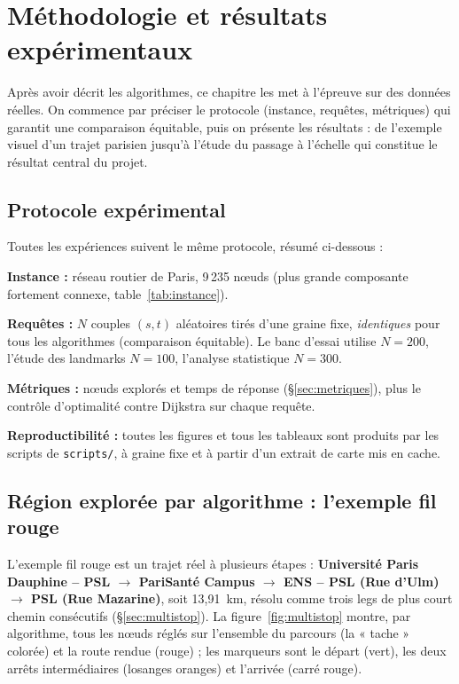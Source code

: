 \chapter{Méthodologie et résultats expérimentaux}
\label{ch:xp}

Après avoir décrit les algorithmes, ce chapitre les met à l'épreuve sur des
données réelles. On commence par préciser le protocole (instance, requêtes,
métriques) qui garantit une comparaison équitable, puis on présente les
résultats : de l'exemple visuel d'un trajet parisien jusqu'à l'étude du passage à
l'échelle qui constitue le résultat central du projet.

\section{Protocole expérimental}
\label{sec:protocole}

Toutes les expériences suivent le même protocole, résumé ci-dessous :

\begin{bulletlist}
  \item \textbf{Instance :} réseau routier de Paris, 9\,235 nœuds
        (plus grande composante fortement connexe, table~\ref{tab:instance}).
  \item \textbf{Requêtes :} $N$ couples $(s, t)$ aléatoires tirés d'une graine
        fixe, \emph{identiques} pour tous les algorithmes (comparaison
        équitable). Le banc d'essai utilise $N = 200$, l'étude des landmarks
        $N = 100$, l'analyse statistique $N = 300$.
  \item \textbf{Métriques :} nœuds explorés et temps de réponse
        (\S\ref{sec:metriques}), plus le contrôle d'optimalité contre Dijkstra sur
        chaque requête.
  \item \textbf{Reproductibilité :} toutes les figures et tous les tableaux sont
        produits par les scripts de \texttt{scripts/}, à graine fixe et à partir
        d'un extrait de carte mis en cache.
\end{bulletlist}

\section{Région explorée par algorithme : l'exemple fil rouge}
\label{sec:filrouge}

L'exemple fil rouge est un trajet réel à plusieurs étapes :
\textbf{Université Paris Dauphine -- PSL $\to$ PariSanté Campus $\to$ ENS -- PSL
(Rue d'Ulm) $\to$ PSL (Rue Mazarine)}, soit 13{,}91~km, résolu comme trois legs de
plus court chemin consécutifs (\S\ref{sec:multistop}). La
figure~\ref{fig:multistop} montre, par algorithme, tous les nœuds réglés sur
l'ensemble du parcours (la « tache » colorée) et la route rendue (rouge) ; les
marqueurs sont le départ (vert), les deux arrêts intermédiaires (losanges
oranges) et l'arrivée (carré rouge).

